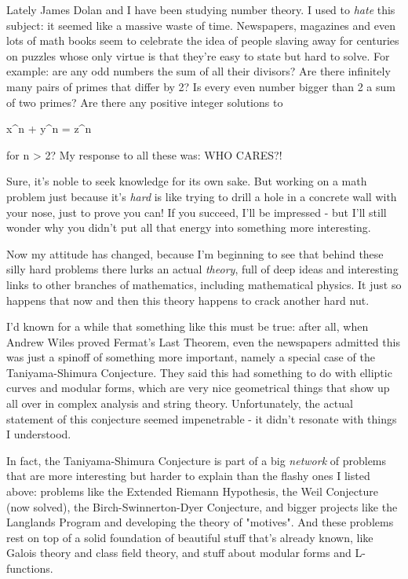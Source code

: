 



Lately James Dolan and I have been studying number theory.  I used to 
\emph{hate} this subject: it seemed like a massive waste of time.  
Newspapers, 
magazines and even lots of math books seem to celebrate the idea of people 
slaving away for centuries on puzzles whose only virtue is that they're 
easy to state but hard to solve.  For example: are any odd numbers the 
sum of all their divisors?  Are there infinitely many pairs of primes 
that differ by 2?  Is every even number bigger than 2 a sum of two primes? 
Are there any positive integer solutions to 

x^{n} + y^{n} = z^{n}

for n > 2?  My response to all these was: WHO CARES?!  

Sure, it's noble to seek knowledge for its own sake.  But working on a 
math problem just because it's \emph{hard} is like trying to drill a hole in 
a concrete wall with your nose, just to prove you can!   If you succeed,
I'll be impressed - but I'll still wonder why you didn't put all that
energy into something more interesting.  

Now my attitude has changed, because I'm beginning to see that behind 
these silly hard problems there lurks an actual \emph{theory}, full of deep 
ideas and interesting links to other branches of mathematics, including 
mathematical physics.  It just so happens that now and then this theory
happens to crack another hard nut.  

I'd known for a while that something like this must be true: after all, 
when Andrew Wiles proved Fermat's Last Theorem, even the newspapers 
admitted this was just a spinoff of something more important, namely 
a special case of the Taniyama-Shimura Conjecture.  They said this had 
something to do with elliptic curves and modular forms, which are very 
nice geometrical things that show up all over in complex analysis and 
string theory.  Unfortunately, the actual statement of this conjecture 
seemed impenetrable - it didn't resonate with things I understood.  

In fact, the Taniyama-Shimura Conjecture is part of a big \emph{network} of 
problems that are more interesting but harder to explain than the flashy 
ones I listed above: problems like the Extended Riemann Hypothesis, the 
Weil Conjecture (now solved), the Birch-Swinnerton-Dyer Conjecture,
and bigger projects like the Langlands Program and developing the theory 
of "motives".  And these problems rest on top 
of a solid foundation of 
beautiful stuff that's already known, like Galois theory and class field 
theory, and stuff about modular forms and L-functions.

